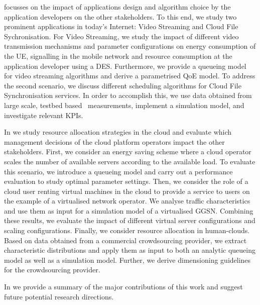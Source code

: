  focusses on the impact of applications design and algorithm choice by the application developers on the other stakeholders.
To this end, we study two prominent applications in today's Internet: Video Streaming and Cloud File Sychronisation.
For Video Streaming, we study the impact of different video transmission mechanisms and parameter configurations on energy consumption of the \gls{UE}, signalling in the mobile network and resource consumption at the application developer using a \gls{DES}.
Furthermore, we provide a queueing model for video streaming algorithms and derive a parametrised \gls{QoE} model.
To address the second scenario, we discuss different scheduling algorithms for Cloud File Synchronisation services.
In order to accomplish this, we use data obtained from large scale, testbed based~\cite{Chun2003} measurements, implement a simulation model, and investigate relevant \glspl{KPI}.

In  we study resource allocation strategies in the cloud and evaluate which management decisions of the cloud platform operators impact the other stakeholders.
First, we consider an energy saving scheme where a cloud operator scales the number of available servers according to the available load.
To evaluate this scenario, we introduce a queueing model and carry out a performance evaluation to study optimal parameter settings.
Then, we consider the role of a cloud user renting virtual machines in the cloud to provide a service to users on the example of a virtualised network operator.
We analyse traffic characteristics and use them as input for a simulation model of a virtualised \gls{GGSN}.
Combining these results, we evaluate the impact of different virtual server configurations and scaling configurations.
Finally, we consider resource allocation in human-clouds.
Based on data obtained from a commercial crowdsourcing provider, we extract characteristic distributions and apply them as input to both an analytic queueing model as well as a simulation model. Further, we derive dimensioning guidelines for the crowdsourcing provider.

In  we provide a summary of the major contributions of this work and suggest future potential research directions.
